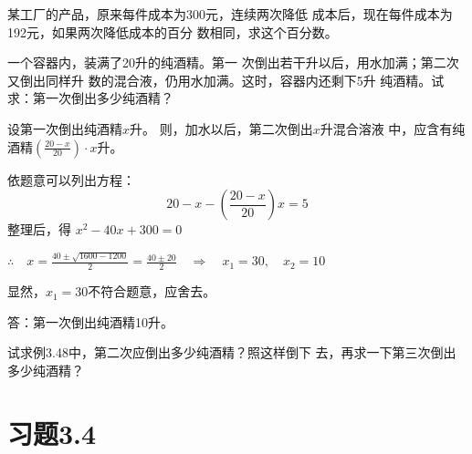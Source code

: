 \begin{ex}
某工厂的产品，原来每件成本为300元，连续两次降低
成本后，现在每件成本为192元，如果两次降低成本的百分
数相同，求这个百分数。
\end{ex}




\begin{example}
一个容器内，装满了20升的纯酒精。第一
次倒出若干升以后，用水加满；第二次又倒出同样升
数的混合液，仍用水加满。这时，容器内还剩下5升
纯酒精。试求：第一次倒出多少纯酒精？
\end{example}

\begin{solution}
    设第一次倒出纯酒精$x$升。
则，加水以后，第二次倒出$x$升混合溶液
中，应含有纯酒精$\left(\frac{20-x}{20}\right)\cdot x$升。

依题意可以列出方程：
\[20-x-\left(\frac{20-x}{20}\right)x=5\]
整理后，得 $x^2-40x+300=0$

$\therefore\quad x=\frac{40\pm \sqrt{1600-1200}}{2}=\frac{40\pm 20}{2}\quad \Rightarrow\quad x_1=30,\quad x_2=10$

显然，$x_1=30$不符合题意，应舍去。

答：第一次倒出纯酒精10升。
\end{solution}

\begin{ex}
    试求例3.48中，第二次应倒出多少纯酒精？照这样倒下
去，再求一下第三次倒出多少纯酒精？
\end{ex}



\section*{习题3.4}

